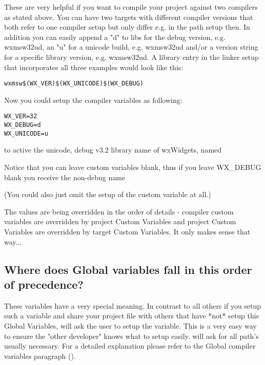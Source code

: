 These are very helpful if you want to compile your project against two compilers as stated above. 
You can have two targets with different compiler versions that both refer to one compiler setup but only differ e.g. in the path setup then. 
In addition you can easily append a "d" to libs for the debug version, e.g. wxmsw32ud, an "u" for a unicode build, e.g. wxmsw32ud and/or a version string for a specific library version, 
e.g. wxmsw32ud. \newline
A library entry in the linker setup that incorporates all three examples would look like this:
\begin{verbatim}
wxmsw$(WX_VER)$(WX_UNICODE)$(WX_DEBUG)
\end{verbatim}

Now you could setup the compiler variables as following:
\begin{verbatim}
WX_VER=32
WX_DEBUG=d
WX_UNICODE=u
\end{verbatim}
to active the unicode, debug v3.2 library name of wxWidgets, named


Notice that you can leave custom variables blank, thus if you leave WX\_DEBUG blank you receive the non-debug name


(You could also just omit the setup of the custom variable at all.)

The values are being overridden in the order of details - compiler custom variables are overridden by project Custom Variables and project Custom Variables are overridden by target Custom Variables. It only makes sense that way... 

\subsection{Where does Global variables fall in this order of precedence?}

These variables have a very special meaning. In contrast to all others if you setup such a variable and share your project file with others that have *not* setup this Global Variables, \codeblocks 
will ask the user to setup the variable. This is a very easy way to ensure the "other developer" knows what to setup easily. \codeblocks will ask for all path's usually necessary.\newline
For a detailed explanation please refer to the Global compiler variables paragraph (). 
